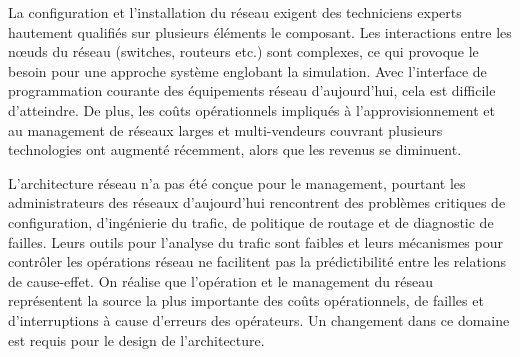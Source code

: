 La configuration et l'installation du réseau exigent des techniciens experts hautement qualifiés sur plusieurs éléments le composant. Les interactions entre les nœuds du réseau (switches, routeurs etc.) sont complexes, ce qui provoque le besoin pour une approche système englobant la simulation. Avec l'interface de programmation courante des équipements réseau d'aujourd'hui, cela est difficile d'atteindre. De plus, les coûts opérationnels impliqués à l'approvisionnement et au management de réseaux larges et multi-vendeurs  couvrant plusieurs technologies ont augmenté récemment, alors que les revenus se diminuent. \cite{ImplementationChallengesForSDN}







L'architecture réseau n'a pas été conçue pour le management, pourtant les administrateurs des réseaux d'aujourd'hui rencontrent des problèmes critiques de configuration, d'ingénierie du trafic, de politique de routage et de diagnostic de failles. Leurs outils pour l'analyse du trafic sont faibles et leurs mécanismes pour contrôler les opérations réseau ne facilitent pas la prédictibilité entre les relations de cause-effet. On réalise que l'opération et le management du réseau représentent la source la plus importante des coûts opérationnels, de failles et d'interruptions à cause d'erreurs des opérateurs. Un changement dans ce domaine est requis pour le design de l'architecture. \cite{NGSIManagement}


\clearpage




